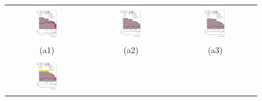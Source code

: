 \documentclass[PAPER, coverpage, atlasdraft=true, texlive=2016, UKenglish]{\ATLASLATEXPATH atlasdoc}
\begin{document}
\begin{figure}[H]
\begin{tabular}{@{}ccc@{}}
\includegraphics[width=0.3\textwidth]{figures/tuH_reg1l2tau1bnj_os.pdf}&
\includegraphics[width=0.3\textwidth]{figures/tuH_reg1l1tau1b1j_ss.pdf}&
\includegraphics[width=0.3\textwidth]{figures/tuH_reg1l1tau1b2j_ss.pdf}\\
(a1)  & (a2) & (a3) \\
\includegraphics[width=0.3\textwidth]{figures/tuH_reg1l1tau1b2j_os.pdf}&

\end{tabular}
\end{figure}
\end{document}

